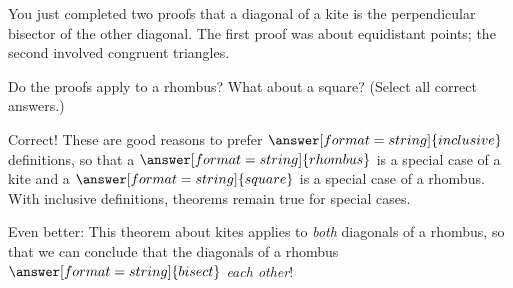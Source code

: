\documentclass[nooutcomes]{ximera}
\begin{document}
\begin{problem}
You just completed two proofs that a diagonal of a kite is the perpendicular bisector of the other diagonal.  The first proof was about equidistant points; the second involved congruent triangles.  

Do the proofs apply to a rhombus? What about a square?  (Select all correct answers.)
\begin{selectAll}
\end{selectAll}
\begin{problem}
Correct!  These are good reasons to prefer $\answer[format=string]{inclusive}$ definitions, so that a $\answer[format=string]{rhombus}$ is a special case of a kite and a 
$\answer[format=string]{square}$ is a special case of a rhombus.  With inclusive definitions, theorems remain true for special cases.  

Even better: This theorem about kites applies to \emph{both} diagonals of a rhombus, so that we can conclude that the diagonals of a rhombus 
$\answer[format=string]{bisect}$ \emph{each other}!  

\end{problem}
\end{problem}
\end{document}
